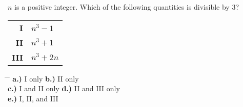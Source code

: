 \documentclass{amsart}
\begin{document}
	
	$n$ is a positive integer. Which of the following quantities is divisible by 3? \\
	\hspace*{3em} \hphantom{3.)\ }
	\begin{tabular}{r l}
		{\bf I}     &   \hspace*{-0.5em}$n^{3} - 1$ \\
		{\bf II}    &   \hspace*{-0.5em}$n^{3} + 1$ \\
		{\bf III}   &   \hspace*{-0.5em}$n^{3} + 2n$
	\end{tabular}
	\begin{tabbing}
		\hspace*{2em} \= \hspace{2.5in} \= \kill
		\> {\textbf{a.) }}I only        \> {\textbf{b.) }}II only \\
		\> {\textbf{c.) }}I and II only \> {\textbf{d.) }}II and III only \\
		\> {\textbf{e.) }}I, II, and III
	\end{tabbing}
		
	
\end{document}
